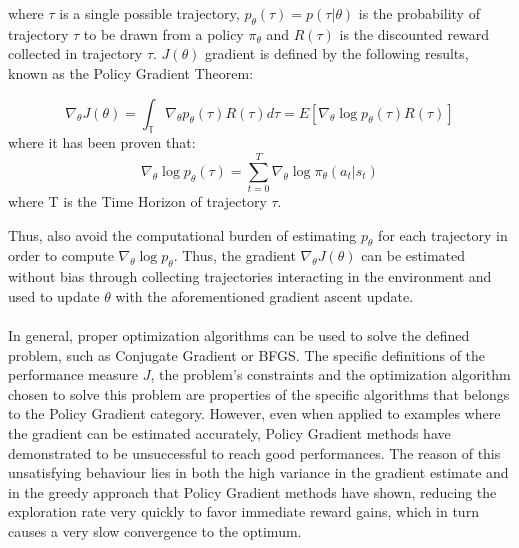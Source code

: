                 where $\tau$ is a single possible trajectory, $p_{\theta}(\tau) = p(\tau|\theta)$ is the probability of trajectory $\tau$ to be drawn from a policy $\pi_{\theta}$ and $R(\tau)$ is the discounted reward collected in trajectory $\tau$. $J(\theta)$ gradient is defined by the following results, known as the Policy Gradient Theorem:
                \begin{theorem}
                    \label{th:policy_gradient}
                    \[ \nabla_{\theta} J(\theta) = \int_{\mathbb{T}} \nabla_{\theta} p_{\theta} (\tau) R(\tau) d\tau = E \left[ \nabla_{\theta} \log p_{\theta}(\tau) R(\tau) \right]\]
                    where it has been proven that:
                    \[ \nabla_{\theta} \log p_{\theta}(\tau) = \sum_{t=0}^{T} \nabla_{\theta} \log \pi_\theta (a_t | s_t) \]
                    where T is the Time Horizon of trajectory $\tau$.
                \end{theorem}
                \noindent
                Thus,  also avoid the computational burden of estimating $p_{\theta}$ for each trajectory in order to compute $\nabla_{\theta} \log p_{\theta}$. Thus, the gradient $\nabla_{\theta} J(\theta)$ can be estimated without bias through collecting trajectories interacting in the environment and used to update $\theta$ with the aforementioned gradient ascent update.
                \\\\
                In general, proper optimization algorithms can be used to solve the defined problem, such as Conjugate Gradient or BFGS. The specific definitions of the performance measure $J$, the problem's constraints and the optimization algorithm chosen to solve this problem are properties of the specific algorithms that belongs to the Policy Gradient category. However, even when applied to examples where the gradient can be estimated accurately, Policy Gradient methods have demonstrated to be unsuccessful to reach good performances. The reason of this unsatisfying behaviour lies in both the high variance in the gradient estimate and in the greedy approach that Policy Gradient methods have shown, reducing the exploration rate very quickly to favor immediate reward gains, which in turn causes a very slow convergence to the optimum. 
                
